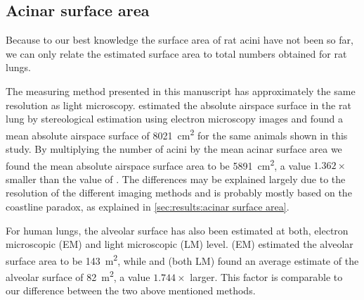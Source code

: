 \documentclass[final,paper=a4,DIV=calc,abstract,english]{scrartcl}
\newcommand{\meanairspacesurface}{5891} %
\newcommand{\airspacedifference}{1.362\xspace} %
\begin{document}
\subsection{Acinar surface area}

Because to our best knowledge the surface area of rat acini have not been  so far, we can only relate the estimated surface area to total numbers obtained for rat lungs.

The measuring method presented in this manuscript has approximately the same resolution as light microscopy.
\citet{Tschanz2003} estimated the absolute airspace surface in the rat lung by stereological estimation using electron microscopy images and found a mean absolute airspace surface of \SI{8021}{\centi\meter\squared} for the same animals shown in this study.
By multiplying the number of acini by the mean acinar surface area we found the mean absolute airspace surface area to be \SI{\meanairspacesurface}{\centi\meter\squared}, a value \(\airspacedifference\times\) smaller than the value of \citeauthor{Tschanz2003}.
The differences may be explained largely due to the resolution of the different imaging methods and is probably mostly based on the coastline paradox, as explained in \autoref{sec:results:acinar surface area}.

For human lungs, the alveolar surface has also been estimated at both, electron microscopic (EM) and light microscopic (LM) level.
\citet{Gehr1978} (EM) estimated the alveolar surface area to be \SI{143}{\square\meter}, while \citet{Weibel1963} and \citet{Thurlbeck1967} (both LM) found an average estimate of the alveolar surface of \SI{82}{\square\meter}, a value \(1.744\times\) larger.
This factor is comparable to our difference between the two above mentioned methods.
\end{document}
